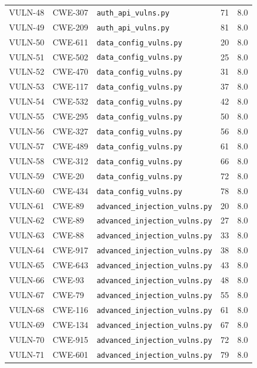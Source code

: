 \documentclass[11pt,a4paper]{article}
\begin{document}
\begin{longtable}{@{}l l l r l@{}}
VULN-48 & CWE-307 & \texttt{auth\_api\_vulns.py} & 71 & 8.0 \\
VULN-49 & CWE-209 & \texttt{auth\_api\_vulns.py} & 81 & 8.0 \\
VULN-50 & CWE-611 & \texttt{data\_config\_vulns.py} & 20 & 8.0 \\
VULN-51 & CWE-502 & \texttt{data\_config\_vulns.py} & 25 & 8.0 \\
VULN-52 & CWE-470 & \texttt{data\_config\_vulns.py} & 31 & 8.0 \\
VULN-53 & CWE-117 & \texttt{data\_config\_vulns.py} & 37 & 8.0 \\
VULN-54 & CWE-532 & \texttt{data\_config\_vulns.py} & 42 & 8.0 \\
VULN-55 & CWE-295 & \texttt{data\_config\_vulns.py} & 50 & 8.0 \\
VULN-56 & CWE-327 & \texttt{data\_config\_vulns.py} & 56 & 8.0 \\
VULN-57 & CWE-489 & \texttt{data\_config\_vulns.py} & 61 & 8.0 \\
VULN-58 & CWE-312 & \texttt{data\_config\_vulns.py} & 66 & 8.0 \\
VULN-59 & CWE-20 & \texttt{data\_config\_vulns.py} & 72 & 8.0 \\
VULN-60 & CWE-434 & \texttt{data\_config\_vulns.py} & 78 & 8.0 \\
VULN-61 & CWE-89 & \texttt{advanced\_injection\_vulns.py} & 20 & 8.0 \\
VULN-62 & CWE-89 & \texttt{advanced\_injection\_vulns.py} & 27 & 8.0 \\
VULN-63 & CWE-88 & \texttt{advanced\_injection\_vulns.py} & 33 & 8.0 \\
VULN-64 & CWE-917 & \texttt{advanced\_injection\_vulns.py} & 38 & 8.0 \\
VULN-65 & CWE-643 & \texttt{advanced\_injection\_vulns.py} & 43 & 8.0 \\
VULN-66 & CWE-93 & \texttt{advanced\_injection\_vulns.py} & 48 & 8.0 \\
VULN-67 & CWE-79 & \texttt{advanced\_injection\_vulns.py} & 55 & 8.0 \\
VULN-68 & CWE-116 & \texttt{advanced\_injection\_vulns.py} & 61 & 8.0 \\
VULN-69 & CWE-134 & \texttt{advanced\_injection\_vulns.py} & 67 & 8.0 \\
VULN-70 & CWE-915 & \texttt{advanced\_injection\_vulns.py} & 72 & 8.0 \\
VULN-71 & CWE-601 & \texttt{advanced\_injection\_vulns.py} & 79 & 8.0 \\

\end{longtable}
\end{document}

